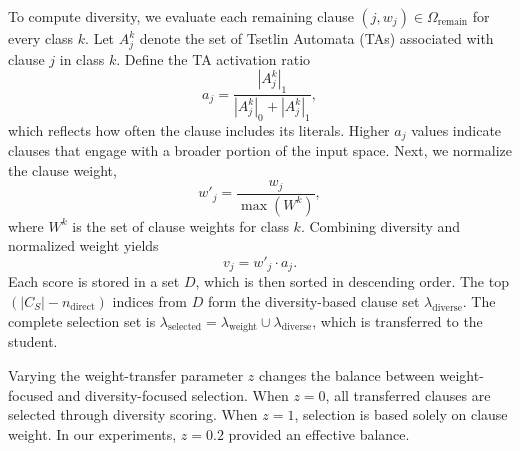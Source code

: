 \documentclass[sn-mathphys-num]{sn-jnl}%
\theoremstyle{thmstyleone}%
\theoremstyle{thmstyletwo}%
\theoremstyle{thmstylethree}%
\begin{document}
To compute diversity, we evaluate each remaining clause $(j,w_j) \in \Omega_{\text{remain}}$ for every class $k$. Let $A_j^k$ denote the set of Tsetlin Automata (TAs) associated with clause $j$ in class $k$. Define the TA activation ratio
\[
a_j = \frac{|A_j^k|_1}{|A_j^k|_0 + |A_j^k|_1},
\]
which reflects how often the clause includes its literals. Higher $a_j$ values indicate clauses that engage with a broader portion of the input space. Next, we normalize the clause weight,
\[
w'_j = \frac{w_j}{\max(W^k)},
\]
where $W^k$ is the set of clause weights for class $k$. Combining diversity and normalized weight yields
\[
v_j = w'_j \cdot a_j.
\]
Each score is stored in a set $D$, which is then sorted in descending order. The top $(|C_S| - n_{\text{direct}})$ indices from $D$ form the diversity-based clause set $\lambda_{\text{diverse}}$. The complete selection set is $\lambda_{\text{selected}} = \lambda_{\text{weight}} \cup \lambda_{\text{diverse}}$, which is transferred to the student.

Varying the weight-transfer parameter $z$ changes the balance between weight-focused and diversity-focused selection. When $z=0$, all transferred clauses are selected through diversity scoring. When $z=1$, selection is based solely on clause weight. In our experiments, $z=0.2$ provided an effective balance.
\end{document}
